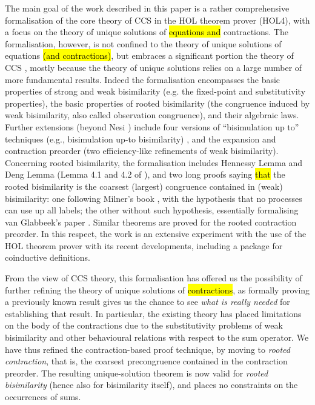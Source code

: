 The main goal of the work described in this paper is a rather
comprehensive formalisation of the core theory of CCS in the HOL
theorem prover (HOL4),  with a focus on the theory of unique solutions
of \hl{equations and} contractions.
The formalisation, however, is not confined to the theory of unique
solutions of equations \hl{(and contractions)}, but embraces a
significant portion the theory of CCS \cite{Mil89}, mostly because the
theory of unique solutions relies on a large number of more fundamental results.
Indeed the formalisation encompasses the basic properties of strong and weak
bisimilarity (e.g. the fixed-point and substitutivity properties), the
basic properties of
rooted bisimilarity (the congruence induced by weak
bisimilarity, also called observation congruence), and
their algebraic laws. Further extensions (beyond Nesi
\cite{Nesi:1992ve}) include four versions of ``bisimulation up to''
techniques (e.g., bisimulation up-to bisimilarity) \cite{Mil89,sangiorgi1992problem}, and the
expansion and contraction preorder (two
efficiency-like refinements of weak bisimilarity). Concerning rooted bisimilarity, the formalisation
includes Hennessy Lemma and Deng Lemma (Lemma 4.1 and 4.2 of
\cite{Gorrieri:2015jt}),
 and two long proofs saying \hl{that} the rooted bisimilarity is the coarsest (largest)
 congruence contained in (weak) bisimilarity: one following Milner's
 book \cite{Mil89}, with the hypothesis that no processes can use up
 all labels;
the other without such hypothesis, essentially formalising van Glabbeek's paper \cite{van2005characterisation}.
Similar theorems are proved for the rooted contraction preorder.
In this respect, the work is an extensive experiment with the use of the HOL theorem prover with its
recent developments, including a package for coinductive definitions.

From the view of CCS theory, this formalisation has offered us the possibility of
further refining the theory of unique solutions of \hl{contractions}, as
formally proving a previously known result gives us the
chance to see \emph{what is really needed} for establishing that result.
In particular, the existing theory \cite{sangiorgi2017equations} has
placed limitations on the body of the contractions due to the
substitutivity problems of weak bisimilarity and other behavioural relations with respect
to the sum operator.
We have thus refined the contraction-based proof technique, by moving to  
\emph{rooted contraction}, that is, the coarsest precongruence contained in the contraction
preorder. The resulting unique-solution theorem is now valid for
\emph{rooted bisimilarity} (hence also for bisimilarity itself), and places no 
constraints on the occurrences of sums.

